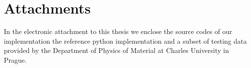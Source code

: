 \documentclass[12pt,a4paper,twoside,openright]{report}
\let\openright=\cleardoublepage
\begin{document}



\tableofcontents



%




%
\printbibliography
{}



\appendix


\chapter{Attachments}

In the electronic attachment to this thesis we enclose the source codes of our implementation the reference python implementation and a subset of testing data provided by the Department of Physics of Material at Charles University in Prague.

\openright
\end{document}
